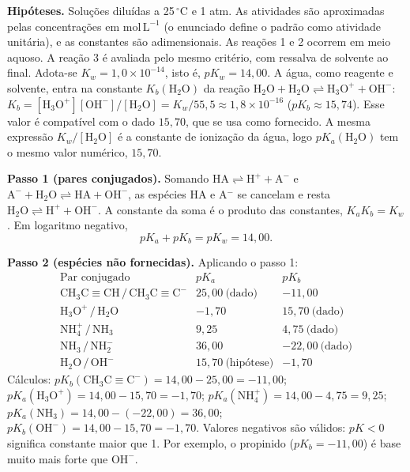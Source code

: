 \documentclass{article}%
\begin{document}
\textbf{Hipóteses.} Soluções diluídas a 25\,$^{\circ}$C e 1 atm. As atividades são aproximadas pelas concentrações em $\mathrm{mol\,L^{-1}}$ (o enunciado define o padrão como atividade unitária), e as constantes são adimensionais. As reações 1 e 2 ocorrem em meio aquoso. A reação 3 é avaliada pelo mesmo critério, com ressalva de solvente ao final. Adota-se $K_w = 1{,}0\times10^{-14}$, isto é, $pK_w = 14{,}00$. A água, como reagente e solvente, entra na constante $K_b(\mathrm{H_2O})$ da reação $\mathrm{H_2O} + \mathrm{H_2O} \rightleftharpoons \mathrm{H_3O^+} + \mathrm{OH^-}$: $K_b = [\mathrm{H_3O^+}][\mathrm{OH^-}]/[\mathrm{H_2O}] = K_w/55{,}5 \approx 1{,}8\times10^{-16}$ ($pK_b \approx 15{,}74$). Esse valor é compatível com o dado $15{,}70$, que se usa como fornecido. A mesma expressão $K_w/[\mathrm{H_2O}]$ é a constante de ionização da água, logo $pK_a(\mathrm{H_2O})$ tem o mesmo valor numérico, $15{,}70$.

\textbf{Passo 1 (pares conjugados).} Somando $\mathrm{HA} \rightleftharpoons \mathrm{H^+} + \mathrm{A^-}$ e $\mathrm{A^-} + \mathrm{H_2O} \rightleftharpoons \mathrm{HA} + \mathrm{OH^-}$, as espécies HA e A$^-$ se cancelam e resta $\mathrm{H_2O} \rightleftharpoons \mathrm{H^+} + \mathrm{OH^-}$. A constante da soma é o produto das constantes, $K_aK_b = K_w$. Em logaritmo negativo,
\[
pK_a + pK_b = pK_w = 14{,}00 .
\]

\textbf{Passo 2 (espécies não fornecidas).} Aplicando o passo 1:
\[
\begin{array}{lcc}
\text{Par conjugado} & pK_a & pK_b \\ \hline
\mathrm{CH_3C{\equiv}CH}\,/\,\mathrm{CH_3C{\equiv}C^-} & 25{,}00\ \text{(dado)} & -11{,}00 \\
\mathrm{H_3O^+}\,/\,\mathrm{H_2O} & -1{,}70 & 15{,}70\ \text{(dado)} \\
\mathrm{NH_4^+}\,/\,\mathrm{NH_3} & 9{,}25 & 4{,}75\ \text{(dado)} \\
\mathrm{NH_3}\,/\,\mathrm{NH_2^-} & 36{,}00 & -22{,}00\ \text{(dado)} \\
\mathrm{H_2O}\,/\,\mathrm{OH^-} & 15{,}70\ \text{(hipótese)} & -1{,}70
\end{array}
\]
Cálculos: $pK_b(\mathrm{CH_3C{\equiv}C^-}) = 14{,}00 - 25{,}00 = -11{,}00$; $pK_a(\mathrm{H_3O^+}) = 14{,}00 - 15{,}70 = -1{,}70$; $pK_a(\mathrm{NH_4^+}) = 14{,}00 - 4{,}75 = 9{,}25$; $pK_a(\mathrm{NH_3}) = 14{,}00 - (-22{,}00) = 36{,}00$; $pK_b(\mathrm{OH^-}) = 14{,}00 - 15{,}70 = -1{,}70$. Valores negativos são válidos: $pK < 0$ significa constante maior que 1. Por exemplo, o propinido ($pK_b = -11{,}00$) é base muito mais forte que $\mathrm{OH^-}$.
\end{document}
